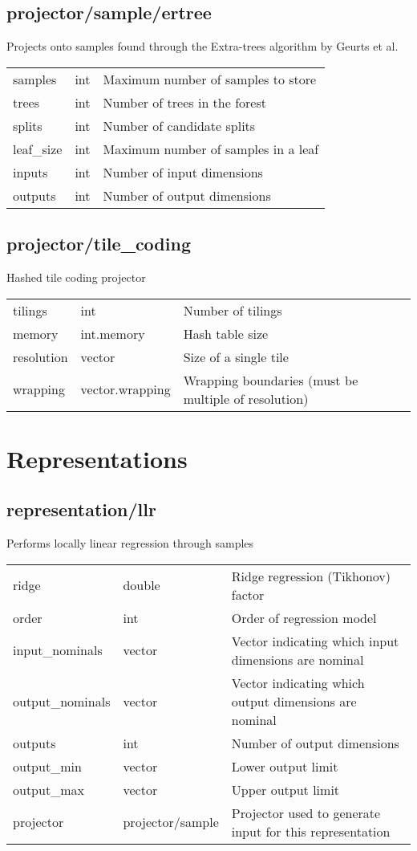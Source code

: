 \subsection{projector/sample/ertree}
\noindent Projects onto samples found through the Extra-trees algorithm by Geurts et al.\\

\noindent\begin{tabular}{@{}lll@{}}
samples&int&Maximum number of samples to store\\
trees&int&Number of trees in the forest\\
splits&int&Number of candidate splits\\
leaf\_size&int&Maximum number of samples in a leaf\\
inputs&int&Number of input dimensions\\
outputs&int&Number of output dimensions\\
\end{tabular}
\subsection{projector/tile\_coding}
\noindent Hashed tile coding projector\\

\noindent\begin{tabular}{@{}lll@{}}
tilings&int&Number of tilings\\
memory&int.memory&Hash table size\\
resolution&vector&Size of a single tile\\
wrapping&vector.wrapping&Wrapping boundaries (must be multiple of resolution)\\
\end{tabular}
\section{Representations}
\subsection{representation/llr}
\noindent Performs locally linear regression through samples\\

\noindent\begin{tabular}{@{}lll@{}}
ridge&double&Ridge regression (Tikhonov) factor\\
order&int&Order of regression model\\
input\_nominals&vector&Vector indicating which input dimensions are nominal\\
output\_nominals&vector&Vector indicating which output dimensions are nominal\\
outputs&int&Number of output dimensions\\
output\_min&vector&Lower output limit\\
output\_max&vector&Upper output limit\\
projector&projector/sample&Projector used to generate input for this representation\\
\end{tabular}
